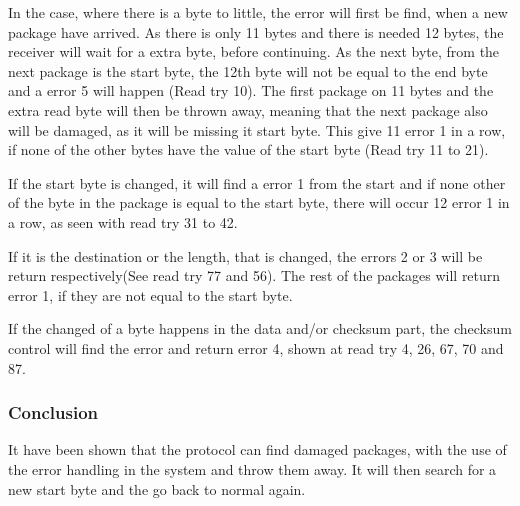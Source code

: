 In the case, where there is a byte to little, the error will first be find, when a new package have arrived. As there is only 11 bytes and there is needed 12 bytes, the receiver will wait for a extra byte, before continuing. As the next byte, from the next package is the start byte, the 12th byte will not be equal to the end byte and a error 5 will happen (Read try 10). The first package on 11 bytes and the extra read byte will then be thrown away, meaning that the next package also will be damaged, as it will be missing it start byte. This give 11 error 1 in a row, if none of the other bytes have the value of the start byte (Read try 11 to 21).

If the start byte is changed, it will find a error 1 from the start and if none other of the byte in the package is equal to the start byte, there will occur 12 error 1 in a row, as seen with read try 31 to 42.

If it is the destination or the length, that is changed, the errors 2 or 3 will be return respectively(See read try 77 and 56). The rest of the packages will return error 1, if they are not equal to the start byte.

If the changed of a byte happens in the data and/or checksum part, the checksum control will find the error and return error 4, shown at read try 4, 26, 67, 70 and 87.

\subsubsection{Conclusion}
It have been shown that the protocol can find damaged packages, with the use of the error handling in the system and throw them away. It will then search for a new start byte and the go back to normal again.
